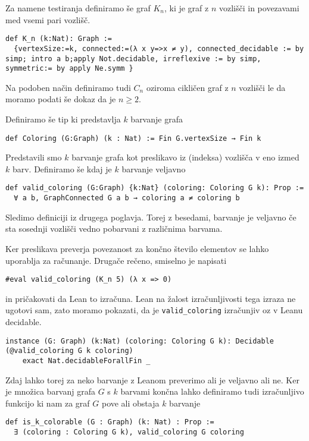 \documentclass[mat1]{fmfdelo}
\begin{document}
Za namene testiranja definiramo še graf $K_n$, ki je graf z $n$ vozlišči in povezavami med vsemi pari vozlišč.
\begin{lstlisting}
def K_n (k:Nat): Graph :=
  {vertexSize:=k, connected:=(λ x y=>x ≠ y), connected_decidable := by simp; intro a b;apply Not.decidable, irreflexive := by simp, symmetric:= by apply Ne.symm }
\end{lstlisting}
Na podoben način definiramo tudi $C_n$ oziroma cikličen graf z $n$ vozlišči le da moramo podati še dokaz da je $n\ge2$.

Definiramo še tip ki predstavlja $k$ barvanje grafa
\begin{lstlisting}
def Coloring (G:Graph) (k : Nat) := Fin G.vertexSize → Fin k
\end{lstlisting}

Predstavili smo $k$ barvanje grafa kot preslikavo iz (indeksa) vozlišča v eno izmed $k$ barv.
Definiramo še kdaj je $k$ barvanje veljavno
\begin{lstlisting}
def valid_coloring (G:Graph) {k:Nat} (coloring: Coloring G k): Prop :=
  ∀ a b, GraphConnected G a b → coloring a ≠ coloring b
\end{lstlisting}
Sledimo definiciji iz drugega poglavja. Torej z besedami, barvanje je veljavno 
če sta sosednji vozlišči vedno pobarvani z različnima barvama.

Ker preslikava preverja povezanost za končno število elementov se lahko uporablja za računanje. Drugače rečeno, smiselno
je napisati
\begin{lstlisting}
#eval valid_coloring (K_n 5) (λ x => 0)
\end{lstlisting}
in pričakovati da Lean to izračuna. Lean na žalost izračunljivosti tega izraza ne ugotovi sam, zato moramo pokazati, 
da je \lstinline{valid_coloring} izračunjiv oz v Leanu decidable.
\begin{lstlisting}
instance (G: Graph) (k:Nat) (coloring: Coloring G k): Decidable (@valid_coloring G k coloring)
    exact Nat.decidableForallFin _
\end{lstlisting}

Zdaj lahko torej za neko barvanje z Leanom preverimo ali je veljavno ali ne. 
Ker je množica barvanj grafa $G$ s $k$ barvami končna lahko definiramo tudi izračunljivo funkcijo ki nam 
za graf $G$ pove ali obstaja $k$ barvanje
\begin{lstlisting}
def is_k_colorable (G : Graph) (k: Nat) : Prop :=
  ∃ (coloring : Coloring G k), valid_coloring G coloring
\end{lstlisting}
\end{document}
